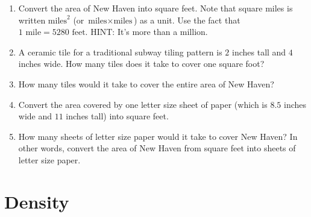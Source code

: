 \begin{enumerate}
		\item Convert the area of New Haven into square feet. Note that square miles is written $\text{miles}^{2}$ (or $\text{miles}\times\text{miles}$) as a unit. Use the fact that $1\text{ mile}=5280\text{ feet}$. HINT: It's more than a million. 
		\wbvfill
		\item A ceramic tile for a traditional subway tiling pattern is $2$ inches tall and $4$ inches wide. How many tiles does it take to cover one square foot?
		\wbvfill
		\item How many tiles would it take to cover the entire area of New Haven?
		\wbvfill
		\wbnewpage
		
		\item Convert the area covered by one letter size sheet of paper (which is $8.5$ inches wide and $11$ inches tall) into square feet.
		\wbvfill
		\item How many sheets of letter size paper would it take to cover New Haven? In other words, convert the area of New Haven from square feet into sheets of letter size paper.
		\wbvfill
		
	\end{enumerate}

\iffalse

\section{Density}\label{sec:proportions}

